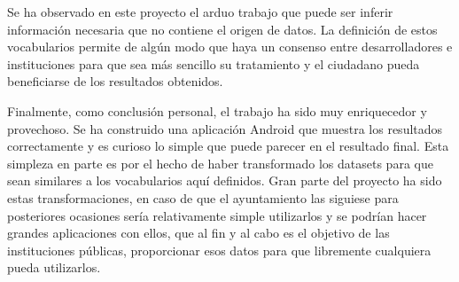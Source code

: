 Se ha observado en este proyecto el arduo trabajo que puede ser inferir información necesaria que no contiene el origen de datos. La definición de estos vocabularios permite de algún modo que haya un consenso entre desarrolladores e instituciones para que sea más sencillo su tratamiento y el ciudadano pueda beneficiarse de los resultados obtenidos.



Finalmente, como conclusión personal, el trabajo ha sido muy enriquecedor y provechoso. Se ha construido una aplicación Android que muestra los resultados correctamente y es curioso lo simple que puede parecer en el resultado final. Esta simpleza en parte es por el hecho de haber transformado los datasets para que sean similares a los vocabularios aquí definidos. Gran parte del proyecto ha sido estas transformaciones, en caso de que el ayuntamiento las siguiese para posteriores ocasiones sería relativamente simple utilizarlos y se podrían hacer grandes aplicaciones con ellos, que al fin y al cabo es el objetivo de las instituciones públicas, proporcionar esos datos para que libremente cualquiera pueda utilizarlos.
